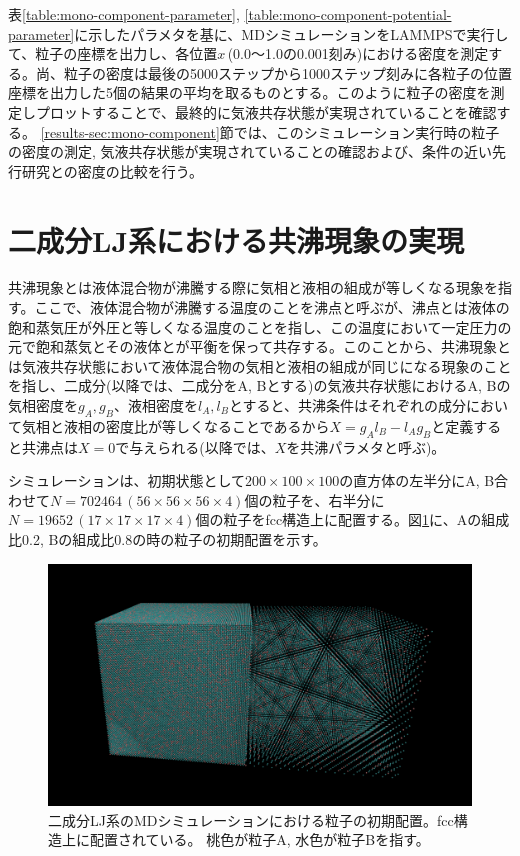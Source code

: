 \documentclass[titlepage]{jsreport}
\begin{document}
表\ref{table:mono-component-parameter}, \ref{table:mono-component-potential-parameter}に示したパラメタを基に、MDシミュレーションをLAMMPSで実行して、粒子の座標を出力し、各位置$x$\,(0.0〜1.0の0.001刻み)における密度を測定する。尚、粒子の密度は最後の5000ステップから1000ステップ刻みに各粒子の位置座標を出力した5個の結果の平均を取るものとする。このように粒子の密度を測定しプロットすることで、最終的に気液共存状態が実現されていることを確認する。
\ref{results-sec:mono-component}節では、このシミュレーション実行時の粒子の密度の測定, 気液共存状態が実現されていることの確認および、条件の近い先行研究との密度の比較を行う。


\section{二成分LJ系における共沸現象の実現} \label{method-sec:bi-component-azeotrope}
共沸現象とは液体混合物が沸騰する際に気相と液相の組成が等しくなる現象を指す。ここで、液体混合物が沸騰する温度のことを沸点と呼ぶが、沸点とは液体の飽和蒸気圧が外圧と等しくなる温度のことを指し\cite{atkins}、この温度において一定圧力の元で飽和蒸気とその液体とが平衡を保って共存する。このことから、共沸現象とは気液共存状態において液体混合物の気相と液相の組成が同じになる現象のことを指し、二成分(以降では、二成分をA, Bとする)の気液共存状態におけるA, Bの気相密度を$g_A, g_B$、液相密度を$l_A, l_B$とすると、共沸条件はそれぞれの成分において気相と液相の密度比が等しくなることであるから$X=g_Al_B-l_Ag_B$と定義すると共沸点は$X=0$で与えられる(以降では、$X$を共沸パラメタと呼ぶ)。

シミュレーションは、初期状態として$200×100×100$の直方体の左半分にA, B合わせて$N=702464\,(56×56×56×4)$個の粒子を、右半分に$N=19652\,(17×17×17×4)$個の粒子をfcc構造上に配置する。図\ref{fig:lan140493-lbn561971-ran3930-rbn15722-first}に、Aの組成比0.2, Bの組成比0.8の時の粒子の初期配置を示す。

\begin{figure}[htbp]
    \begin{center}
        \includegraphics[width=14cm]{fig/lan140493-lbn561971-ran3930-rbn15722/lan140493-lbn561971-ran3930-rbn15722-first.png}
    \end{center}
    \caption{二成分LJ系のMDシミュレーションにおける粒子の初期配置。fcc構造上に配置されている。
    桃色が粒子A, 水色が粒子Bを指す。}
    \label{fig:lan140493-lbn561971-ran3930-rbn15722-first}
\end{figure}
\end{document}
